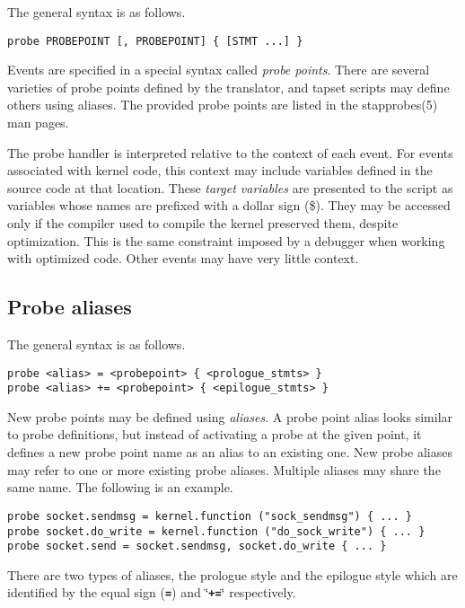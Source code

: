 \documentclass[twoside,english]{article}
\newenvironment{vindent}
{\begin{list}{}{\setlength{\listparindent}{6pt}}
\item[]}
{\end{list}}
\begin{document}
The general syntax is as follows.

\begin{vindent}
\begin{verbatim}
probe PROBEPOINT [, PROBEPOINT] { [STMT ...] }
\end{verbatim}
\end{vindent}
Events are specified in a special syntax called \emph{probe points}. There
are several varieties of probe points defined by the translator, and tapset
scripts may define others using aliases. The provided probe points are listed
in the stapprobes(5) man pages.

The probe handler is interpreted relative to the context of each event. For
events associated with kernel code, this context may include variables defined
in the source code at that location. These \emph{target variables}
are presented to the script as variables whose names are prefixed with a
dollar sign (\$). They may be accessed only if the compiler used to compile
the kernel preserved them, despite optimization. This is the same constraint
imposed by a debugger when working with optimized code. Other events may
have very little context.


\subsection{Probe aliases\label{sub:Probe-aliases}}
The general syntax is as follows.

\begin{vindent}
\begin{verbatim}
probe <alias> = <probepoint> { <prologue_stmts> }
probe <alias> += <probepoint> { <epilogue_stmts> }
\end{verbatim}
\end{vindent}
New probe points may be defined using \emph{aliases}. A probe point alias
looks similar to probe definitions, but instead of activating a probe at
the given point, it defines a new probe point name as an alias to an existing
one. New probe aliases may refer to one or more existing probe aliases. 
Multiple aliases may share the same name. The following is an example.

\begin{vindent}
\begin{verbatim}
probe socket.sendmsg = kernel.function ("sock_sendmsg") { ... }
probe socket.do_write = kernel.function ("do_sock_write") { ... }
probe socket.send = socket.sendmsg, socket.do_write { ... }
\end{verbatim}
\end{vindent}
There are two types of aliases, the prologue style and the epilogue style
which are identified by the equal sign (\texttt{\textbf{=}}) and \char`\"{}\texttt{\textbf{+=}}\char`\"{}
respectively.
\end{document}
